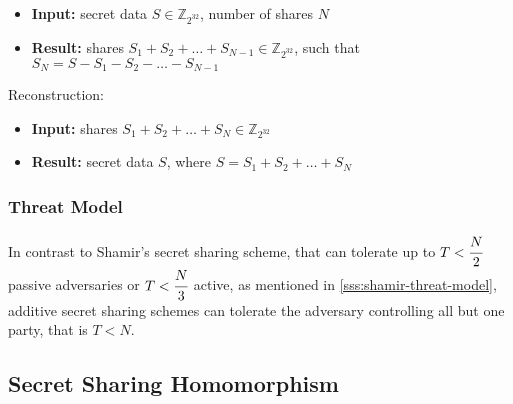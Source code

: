 \begin{itemize}
  \item \textbf{Input:} secret data $S \in \mathbb{Z}_{2^{32}}$, number of shares $N$
  \item \textbf{Result:} shares $S_1 + S_2 + \dots + S_{N-1} \in \mathbb{Z}_{2^{32}}$, such that $S_N = S - S_1 - S_2 - \dots - S_{N-1}$
\end{itemize}

Reconstruction:
\begin{itemize}
  \item \textbf{Input:} shares $S_1 + S_2 + \dots + S_{N} \in \mathbb{Z}_{2^{32}}$
  \item \textbf{Result:} secret data $S$, where $S = S_1 + S_2 + \dots + S_{N}$
\end{itemize}

\subsubsection{Threat Model}\label{sss:additive-threat-model}
In contrast to Shamir's secret sharing scheme, that can tolerate up to $T < \cfrac{N}{2}$ passive adversaries or $T < \cfrac{N}{3}$ active, as mentioned in \ref{sss:shamir-threat-model}, additive secret sharing schemes can tolerate the adversary controlling all but one party, that is $T < N$.


\subsection{Secret Sharing Homomorphism}\label{ss:secret-sharing-homomorphism}
\cite{benaloh1986secret}


